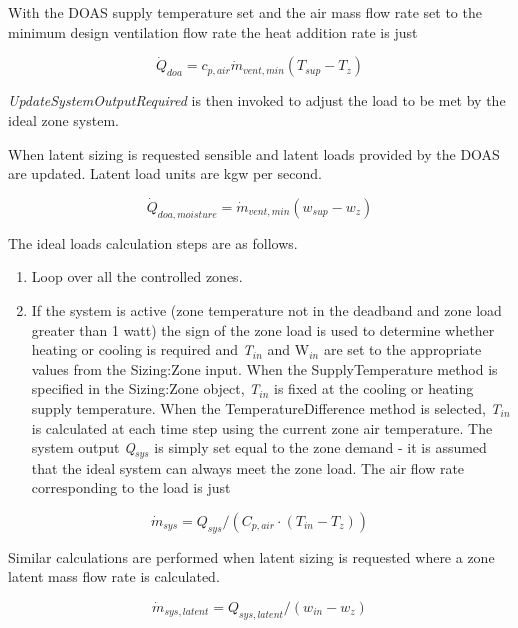 With the DOAS supply temperature set and the air mass flow rate set to the minimum design ventilation flow rate the heat addition rate is just

\begin{equation}
{\dot Q_{doa}} = {c_{p,air}}{\dot m_{vent,min}}({T_{sup}} - {T_z})
\end{equation}

\emph{UpdateSystemOutputRequired} is then invoked to adjust the load to be met by the ideal zone system. 

When latent sizing is requested sensible and latent loads provided by the DOAS are updated. Latent load units are kgw per second.

\begin{equation}
{\dot Q_{doa, moisture}} = {\dot m_{vent,min}}({w_{sup}} - {w_z})
\end{equation}

The ideal loads calculation steps are as follows.

\begin{enumerate}
\def\labelenumi{\arabic{enumi})}
\item
  Loop over all the controlled zones.
\item
  If the system is active (zone temperature not in the deadband and zone load greater than 1 watt) the sign of the zone load is used to determine whether heating or cooling is required and \emph{T\(_{in}\)} and W\emph{\(_{in}\)} are set to the appropriate values from the Sizing:Zone input. When the SupplyTemperature method is specified in the Sizing:Zone object, \emph{T\(_{in}\)} is fixed at the cooling or heating supply temperature. When the TemperatureDifference method is selected, \emph{T\(_{in}\)} is calculated at each time step using the current zone air temperature. The system output \emph{Q\(_{sys}\)} is simply set equal to the zone demand - it is assumed that the ideal system can always meet the zone load. The air flow rate corresponding to the load is just
\end{enumerate}

\begin{equation}
{\dot m_{sys}} = {Q_{sys}}/({C_{p,air}} \cdot ({T_{in}} - {T_z}))
\end{equation}

Similar calculations are performed when latent sizing is requested where a zone latent mass flow rate is calculated.

\begin{equation}
{\dot m_{sys, latent}} = {Q_{sys, latent}}/({w_{in}} - {w_z})
\end{equation}


